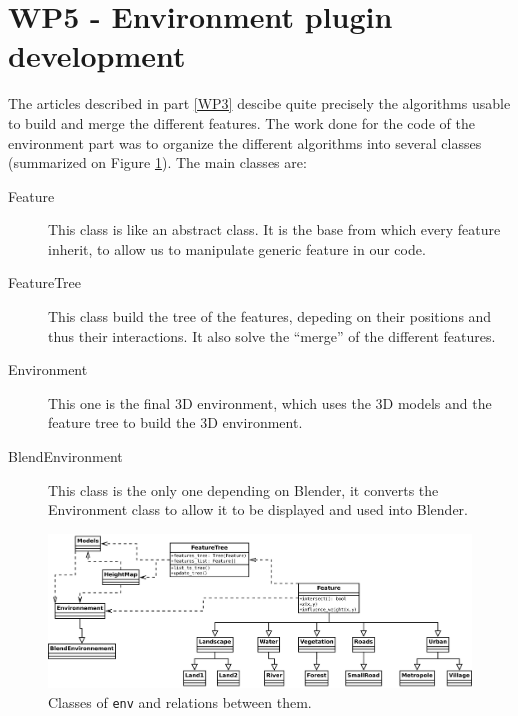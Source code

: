 \section{WP5 - Environment plugin development}

The articles described in part \ref{WP3} descibe quite precisely the algorithms usable to build and merge the different features. The work done for the code of the environment part was to organize the different algorithms into several classes (summarized on Figure \ref{env_classes}). The main classes are:

\begin{description}
  \item[Feature] This class is like an abstract class. It is the base from which every feature inherit, to allow us to manipulate generic feature in our code.
    \item[FeatureTree] This class build the tree of the features, depeding on their positions and thus their interactions. It also solve the ``merge'' of the different features.
    \item[Environment] This one is the final 3D environment, which uses the 3D models and the feature tree to build the 3D environment.
    \item[BlendEnvironment] This class is the only one depending on Blender, it converts the Environment class to allow it to be displayed and used into Blender.
\end{description}

\begin{figure}[h]
  \includegraphics[width=15cm]{env_final.pdf}
  \caption{Classes of \texttt{env} and relations between them.}
  \label{env_classes}
\end{figure}
